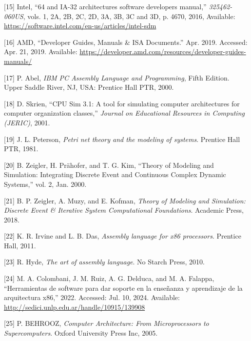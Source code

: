 \documentclass[12pt,twoside]{templates/unerthesis}
\begin{document}
\leavevmode\hypertarget{ref-intel_64_2016}{}%
{[}15{]} Intel, ``64 and IA-32 architectures software developers manual,'' \emph{325462-060US}, vols. 1, 2A, 2B, 2C, 2D, 3A, 3B, 3C and 3D, p. 4670, 2016, Available: \url{https://software.intel.com/en-us/articles/intel-sdm}

\leavevmode\hypertarget{ref-amd_developer_2019}{}%
{[}16{]} AMD, ``Developer Guides, Manuals \& ISA Documents.'' Apr. 2019. Accessed: Apr. 21, 2019. Available: \url{https://developer.amd.com/resources/developer-guides-manuals/}

\leavevmode\hypertarget{ref-abel_ibm_2000}{}%
{[}17{]} P. Abel, \emph{IBM PC Assembly Language and Programming}, Fifth Edition. Upper Saddle River, NJ, USA: Prentice Hall PTR, 2000.

\leavevmode\hypertarget{ref-skrien_cpu_2001}{}%
{[}18{]} D. Skrien, ``CPU Sim 3.1: A tool for simulating computer architectures for computer organization classes,'' \emph{Journal on Educational Resources in Computing (JERIC)}, 2001.

\leavevmode\hypertarget{ref-peterson_petri_1981}{}%
{[}19{]} J. L. Peterson, \emph{Petri net theory and the modeling of systems}. Prentice Hall PTR, 1981.

\leavevmode\hypertarget{ref-zeigler_theory_2000}{}%
{[}20{]} B. Zeigler, H. Prähofer, and T. G. Kim, ``Theory of Modeling and Simulation: Integrating Discrete Event and Continuous Complex Dynamic Systems,'' vol. 2, Jan. 2000.

\leavevmode\hypertarget{ref-zeigler_theory_2018}{}%
{[}21{]} B. P. Zeigler, A. Muzy, and E. Kofman, \emph{Theory of Modeling and Simulation: Discrete Event \& Iterative System Computational Foundations}. Academic Press, 2018.

\leavevmode\hypertarget{ref-irvine2011assembly}{}%
{[}22{]} K. R. Irvine and L. B. Das, \emph{Assembly language for x86 processors}. Prentice Hall, 2011.

\leavevmode\hypertarget{ref-hyde2010art}{}%
{[}23{]} R. Hyde, \emph{The art of assembly language}. No Starch Press, 2010.

\leavevmode\hypertarget{ref-colombani_herramientas_2022}{}%
{[}24{]} M. A. Colombani, J. M. Ruiz, A. G. Delduca, and M. A. Falappa, ``Herramientas de software para dar soporte en la enseñanza y aprendizaje de la arquitectura x86,'' 2022. Accessed: Jul. 10, 2024. Available: \url{http://sedici.unlp.edu.ar/handle/10915/139908}

\leavevmode\hypertarget{ref-behrooz_computer_2005}{}%
{[}25{]} P. BEHROOZ, \emph{Computer Architecture: From Microprocessors to Supercomputers}. Oxford University Press Inc, 2005.
\end{document}
